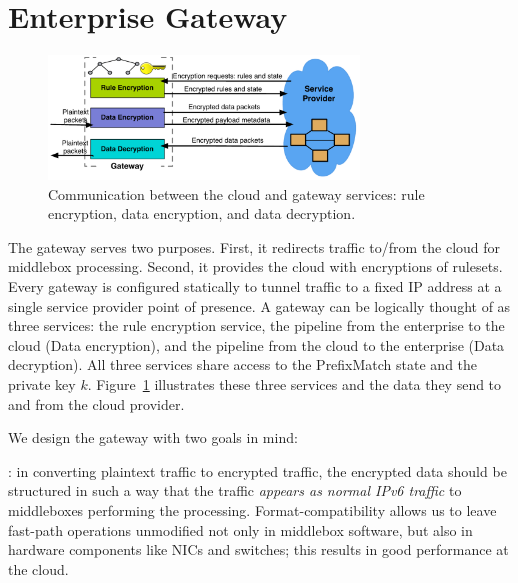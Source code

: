 
\section{Enterprise Gateway}

\label{sec:gateway}

\begin{figure}[t]
  \centering
  \includegraphics[width=3.25in]{fig/gateway2cloud}
  \caption[]{\label{fig:gatewaymeta} Communication between the cloud and gateway services: rule encryption, data encryption, and data decryption.} 
\end{figure}






The gateway serves two purposes. First, it redirects traffic to/from the cloud for middlebox processing. Second, it provides the cloud with encryptions of rulesets.
Every gateway is configured statically to tunnel traffic to a fixed IP address at a single service provider point of presence.
A gateway can be logically thought of as three services: the rule encryption service, the pipeline from the enterprise to the cloud (Data encryption), and the pipeline from the cloud to the enterprise (Data decryption). 
All three services share access to the PrefixMatch state and the private key $k$.
Figure~\ref{fig:gatewaymeta} illustrates  these three services and the data they send to and from the cloud provider.

We design the gateway with two goals in mind: 

: in converting plaintext traffic to encrypted traffic, the encrypted data should be structured in such a way that the traffic {\it appears as normal IPv6 traffic} to middleboxes performing the processing. Format-compatibility allows us to leave fast-path operations unmodified not only in middlebox software, but also in hardware components like NICs and switches; this results in good performance at the cloud.

